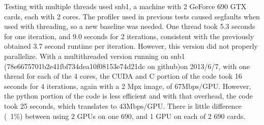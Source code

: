 \documentclass[11pt]{article}
\begin{document}
	Testing with multiple threads used snb1, a machine with 2 GeForce 690 GTX cards, each with 2 cores. The profiler used in previous tests caused segfaults when used with threading, so a new baseline was needed.  One thread took 5.3 seconds for one iteration, and 9.0 seconds for 2 iterations, consistent with the previously obtained 3.7 second runtime per iteration.  However, this version did not properly parallelize.
	With a multithreaded version running on snb1 (78e6675701b2e41fbf734dea10f08153e74d21dc on github)on 2013/6/7, with one thread for each of the 4 cores, the CUDA and C portion of the code took 16 seconds for 4 iterations, again with a 2 Mpx image, of $67 \mathrm{Mbps/GPU}$.  However, the python portion of the code is less efficient and with that overhead, the code took 25 seconds, which translates to $43 \mathrm{Mbps/GPU}$.  There is little difference (~1\%) between using 2 GPUs on one 690, and 1 GPU on each of 2 690 cards.
\end{document}
